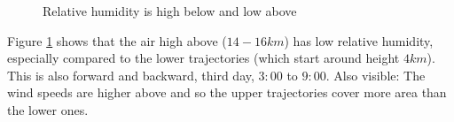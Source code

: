 \begin{figure}
\centering
{}
\caption{Relative humidity is high below and low above}
\label{fig:highanddry}
\end{figure}
Figure \ref{fig:highanddry} shows that the air high above ($14 - 16 km$) has low relative humidity, especially compared to the lower trajectories (which start around height $4 km$). This is also forward and backward, third day, $3:00$ to $9:00$. Also visible: The wind speeds are higher above and so the upper trajectories cover more area than the lower ones.





